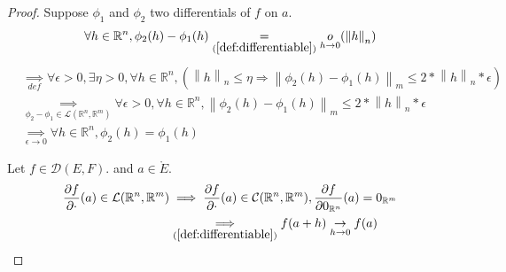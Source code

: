 \documentclass[11pt,en]{elegantpaper}
\newcommand{\norm}[1]{\left\lVert#1\right\rVert}
\newcommand{\Real}{\mathbb{R}}
\begin{document}
\begin{proof}
  Suppose $\phi_1$ and $\phi_2$ two differentials of $f$ on $a$. \begin{equation*}
    \begin{gathered}
      \forall h \in \Real^n, \phi_2(h) - \phi_1(h) \underset{(\ref{def:differentiable})} = \underset{h \to 0}o(\norm h _n)
    \end{gathered}
  \end{equation*}
  \begin{equation*}
    \begin{split}
      & \underset{def} \implies \forall \epsilon > 0, \exists \eta > 0, \forall h \in \Real^n, (\norm h _n \leq \eta \Rightarrow \norm{\phi_2(h) - \phi_1(h)}_m \leq 2 * \norm h _n * \epsilon) \\
      & \underset{\phi_2 - \phi_1 \in \mathcal{L}(\Real^n,\Real^m)} \implies \forall \epsilon > 0, \forall h \in \Real^n, \norm{\phi_2(h) - \phi_1(h)}_m \leq 2 * \norm h _n * \epsilon \\
      & \underset{\epsilon \to 0} \implies \forall h \in \Real^n, \phi_2(h) = \phi_1(h)
    \end{split}
  \end{equation*}
  
  Let $f \in \mathcal{D}(E,F).$ and $a \in \mathring{E}$. \begin{equation*}
    \begin{split}
      \frac{\partial f}{\partial \cdot}(a) \in \mathcal{L}(\Real^n,\Real^m) & \implies \frac{\partial f}{\partial \cdot}(a) \in \mathcal{C}(\Real^n,\Real^m), \frac{\partial f}{\partial 0_{\Real^n}}(a) = 0_{\Real^m} \\
      & \underset{(\ref{def:differentiable})} \implies f(a + h) \underset{h \to 0} \to f(a)
    \end{split}
  \end{equation*}
\end{proof}
\end{document}
